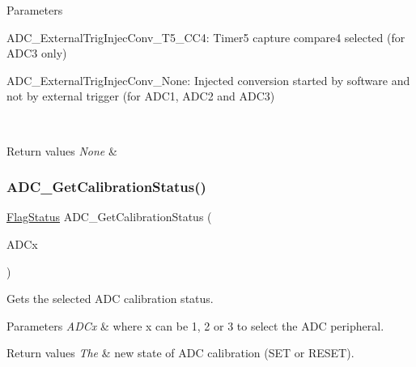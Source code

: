 \begin{DoxyParams}{Parameters}
\begin{DoxyItemize}
\item A\+D\+C\+\_\+\+External\+Trig\+Injec\+Conv\+\_\+\+T5\+\_\+\+C\+C4\+: Timer5 capture compare4 selected (for A\+D\+C3 only)\end{DoxyItemize}
\begin{DoxyItemize}
\item A\+D\+C\+\_\+\+External\+Trig\+Injec\+Conv\+\_\+\+None\+: Injected conversion started by software and not by external trigger (for A\+D\+C1, A\+D\+C2 and A\+D\+C3) \end{DoxyItemize}
\\
\hline
\end{DoxyParams}

\begin{DoxyRetVals}{Return values}
{\em None} & \\
\hline
\end{DoxyRetVals}
\mbox{\label{group___a_d_c___exported___functions_ga7a728f699b487c7fa1694d7424967122}} 
\subsubsection{\texorpdfstring{ADC\_GetCalibrationStatus()}{ADC\_GetCalibrationStatus()}}
{\footnotesize\ttfamily \mbox{\hyperlink{group___exported__types_ga89136caac2e14c55151f527ac02daaff}{Flag\+Status}} A\+D\+C\+\_\+\+Get\+Calibration\+Status (\begin{DoxyParamCaption}\item[{\mbox{\hyperlink{struct_a_d_c___type_def}{A\+D\+C\+\_\+\+Type\+Def}} $\ast$}]{A\+D\+Cx }\end{DoxyParamCaption})}



Gets the selected A\+DC calibration status. 


\begin{DoxyParams}{Parameters}
{\em A\+D\+Cx} & where x can be 1, 2 or 3 to select the A\+DC peripheral. \\
\hline
\end{DoxyParams}

\begin{DoxyRetVals}{Return values}
{\em The} & new state of A\+DC calibration (S\+ET or R\+E\+S\+ET). \\
\hline
\end{DoxyRetVals}
\mbox{\label{group___a_d_c___exported___functions_gaaf74221c285ec5dab5e66baf7bec6bd3}} 
